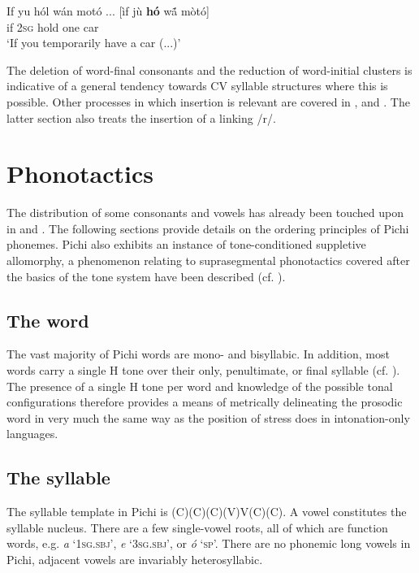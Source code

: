 \ea%
    \label{ex:key:40}
    \gll   If  yu  hól    wán    motó  \op...\cp{}      [ìf  jù  \textbf{hó}  w\'{ã}   mòtó]\\
if  \textsc{2sg}  hold    one    car\\

\glt ‘If you temporarily have a car (...)’
\z

The deletion of word-final consonants and the reduction of word-initial clusters is indicative of a general tendency towards CV syllable structures where this is possible. Other processes in which insertion is relevant are covered in ,  and . The latter section also treats the insertion of a linking /r/.

\section{Phonotactics}\label{sec:2.6}

The distribution of some consonants and vowels has already been touched upon in  and . The following sections provide details on the ordering principles of Pichi phonemes. Pichi also exhibits an instance of tone-conditioned suppletive allomorphy, a phenomenon relating to suprasegmental phonotactics covered after the basics of the tone system have been described (cf. ).

\subsection{The word}\label{sec:2.6.1}

The vast majority of Pichi words are mono- and bisyllabic. In addition, most words carry a single H tone over their only, penultimate, or final syllable (cf. ). The presence of a single H tone per word and knowledge of the possible tonal configurations therefore provides a means of metrically delineating the prosodic word in very much the same way as the position of stress does in intonation-only languages.

\subsection{The syllable}\label{sec:2.6.2}

The syllable template in Pichi is (C)(C)(C)(V)V(C)(C). A vowel constitutes the syllable nucleus. There are a few single-vowel roots, all of which are function words, e.g. \textit{a} ‘\textsc{1sg.sbj}’, \textit{e} ‘\textsc{3sg.sbj}’, or \textit{ó} ‘\textsc{sp}’. There are no phonemic long vowels in Pichi, adjacent vowels are invariably heterosyllabic. 



